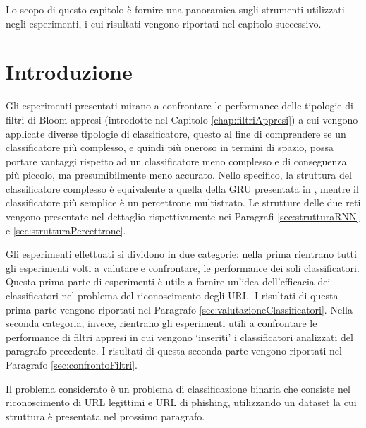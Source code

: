 \documentclass[../../main.tex]{subfiles}
\begin{document}
    Lo scopo di questo capitolo è fornire una panoramica sugli strumenti utilizzati negli esperimenti, i cui risultati vengono riportati nel capitolo successivo. 
    
    \section{Introduzione}
    Gli esperimenti presentati mirano a confrontare le performance delle tipologie di filtri di Bloom appresi (introdotte nel Capitolo \ref{chap:filtriAppresi}) a cui vengono applicate diverse tipologie di classificatore, questo al fine di comprendere se un classificatore più complesso, e quindi più oneroso in termini di spazio, possa portare vantaggi rispetto ad un classificatore meno complesso e di conseguenza più piccolo, ma presumibilmente meno accurato. Nello specifico, la struttura del classificatore complesso è equivalente a quella della GRU presentata in \cite{ma2020}, mentre il classificatore più semplice è un percettrone multistrato. Le strutture delle due reti vengono presentate nel dettaglio rispettivamente nei Paragrafi \ref{sec:strutturaRNN} e \ref{sec:strutturaPercettrone}.

    Gli esperimenti effettuati si dividono in due categorie: nella prima rientrano tutti gli esperimenti volti a valutare e confrontare, le performance dei soli classificatori. Questa prima parte di esperimenti è utile a fornire un'idea dell'efficacia dei classificatori nel problema del riconoscimento degli URL. I risultati di questa prima parte vengono riportati nel Paragrafo \ref{sec:valutazioneClassificatori}. Nella seconda categoria, invece, rientrano gli esperimenti utili a confrontare le performance di filtri appresi in cui vengono `inseriti' i classificatori analizzati del paragrafo precedente. I risultati di questa seconda parte vengono riportati nel Paragrafo \ref{sec:confrontoFiltri}.

    Il problema considerato è un problema di classificazione binaria che consiste nel riconoscimento di URL legittimi e URL di phishing, utilizzando un dataset la cui struttura è presentata nel prossimo paragrafo.
\end{document}
